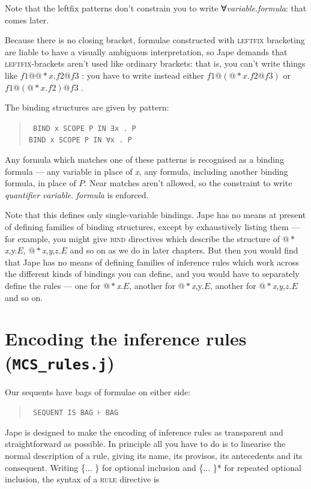 Note that the leftfix patterns don't constrain you to write ∀\textit{variable}.\textit{formula}: that comes later.

Because there is no closing bracket, formulae constructed with \textsc{leftfix} bracketing are liable to have a visually ambiguous interpretation, so Jape demands that \textsc{leftfix}-brackets aren't used like ordinary brackets: that is, you can't write things like $f1@@*x.f2@f3$ : you have to write instead either $f1@(@*x.f2@f3) $ or $f1@(@*x.f2) @f3$ .

The binding structures are given by pattern:
\begin{quote}\tt\small
BIND    x SCOPE P IN ∃x . P\\
BIND    x SCOPE P IN ∀x . P
\end{quote}
Any formula which matches one of these patterns is recognised as a binding formula --- any variable in place of \textit{x}, any formula, including another binding formula, in place of $P$. Near matches aren't allowed, so the constraint to write \textit{quantifier} \textit{variable}. \textit{formula} is enforced.

Note that this defines only single-variable bindings. Jape has no means at present of defining families of binding structures, except by exhaustively listing them --- for example, you might give \textsc{bind} directives which describe the structure of \ensuremath{@*}\textit{x},y.$E$, \ensuremath{@*}\textit{x},\textit{y},$z$.$E$ and so on as we do in later chapters. But then you would find that Jape has no means of defining families of inference rules which work across the different kinds of bindings you can define, and you would have to separately define the rules --- one for \ensuremath{@*}\textit{x}.$E$, another for \ensuremath{@*}\textit{x},y.$E$, another for \ensuremath{@*}\textit{x},\textit{y},$z$.$E$ and so on.

\section{Encoding the inference rules (\texttt{MCS\_rules.j})}

Our sequents have bags of formulae on either side:

\begin{quote}\tt\small
SEQUENT IS BAG ⊦ BAG
\end{quote}

Jape is designed to make the encoding of inference rules as transparent and straightforward as possible. In principle all you have to do is to linearise the normal description of a rule, giving its name, its provisos, its antecedents and its consequent. Writing \{... \} for optional inclusion and \{... \}* for repeated optional inclusion, the syntax of a \textsc{rule} directive is

